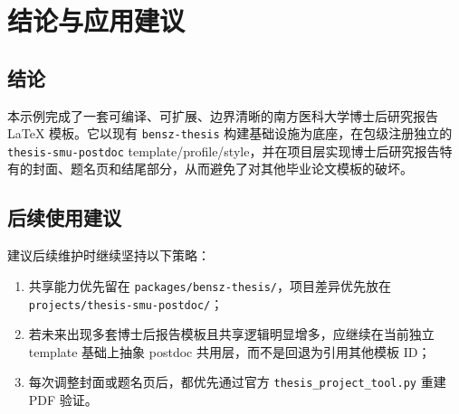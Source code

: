 \chapter{结论与应用建议}

\section{结论}

本示例完成了一套可编译、可扩展、边界清晰的南方医科大学博士后研究报告 LaTeX 模板。它以现有 \texttt{bensz-thesis} 构建基础设施为底座，在包级注册独立的 \texttt{thesis-smu-postdoc} template/profile/style，并在项目层实现博士后研究报告特有的封面、题名页和结尾部分，从而避免了对其他毕业论文模板的破坏。

\section{后续使用建议}

建议后续维护时继续坚持以下策略：

\begin{enumerate}
  \item 共享能力优先留在 \texttt{packages/bensz-thesis/}，项目差异优先放在 \texttt{projects/thesis-smu-postdoc/}；
  \item 若未来出现多套博士后报告模板且共享逻辑明显增多，应继续在当前独立 template 基础上抽象 postdoc 共用层，而不是回退为引用其他模板 ID；
  \item 每次调整封面或题名页后，都优先通过官方 \texttt{thesis\_project\_tool.py} 重建 PDF 验证。
\end{enumerate}
